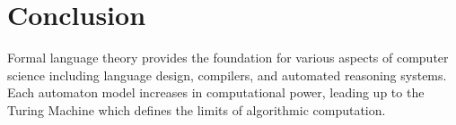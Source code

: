 \documentclass[12pt]{article}
\begin{document}
\section{Conclusion}
Formal language theory provides the foundation for various aspects of computer science including language design, compilers, and automated reasoning systems. Each automaton model increases in computational power, leading up to the Turing Machine which defines the limits of algorithmic computation.
\end{document}

